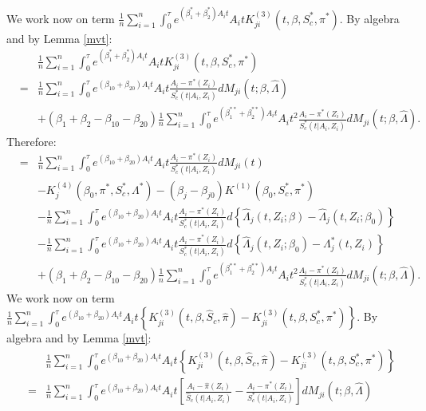 \documentclass[11pt]{article}
\newcommand{\ee}{\end{eqnarray}}
\newcommand{\eqnn}{\begin{eqnarray*}}
\newcommand{\een}{\end{eqnarray*}}
\newcommand{\be}{\begin{eqnarray}}
\begin{document}
\begin{newproof7}
We work now on term $\frac{1}{n}\sum_{i=1}^n\int_0^\tau e^{ (\beta^{*}_1  + \beta^{*}_2)A_i t}A_i t K^{(3)}_{ji}(t, \beta,S^{*}_c,\pi^{*})$. By algebra and by Lemma \ref{mvt}:
\eqnn
&&\frac{1}{n}\sum_{i=1}^n\int_0^\tau e^{ (\beta^{*}_1  + \beta^{*}_2)A_i t}A_i t K^{(3)}_{ji}(t, \beta,S^{*}_c,\pi^{*})\\&=&\frac{1}{n}\sum_{i=1}^n\int_0^\tau e^{ (\beta_{10}  + \beta_{20})A_i t}A_i t \frac{A_i -\pi^{*}( Z_i)}{S^{*}_c(t | A_i,Z_i)}dM_{ji}(t ; \beta, \hat \Lambda)\nonumber\\
&&+(\beta_1+\beta_2-\beta_{10}-\beta_{20})\frac{1}{n}\sum_{i=1}^n\int_0^\tau e^{ (\beta^{**}_1  + \beta^{**}_2)A_i t}A_i t^2 \frac{A_i -\pi^{*}( Z_i)}{S^{*}_c(t | A_i,Z_i)}dM_{ji}(t ; \beta, \hat \Lambda).\nonumber\een
Therefore:
\be\label{31}
&=&\frac{1}{n}\sum_{i=1}^n\int_0^\tau e^{ (\beta_{10}  + \beta_{20})A_i t}A_i t \frac{A_i -\pi^{*}( Z_i)}{S^{*}_c(t | A_i,Z_i)}dM_{ji}(t)\nonumber\\
&&-K^{(4)}_j(\beta_0, \pi^{*}, S^{*}_c, \Lambda^{*})-(\beta_j-\beta_{j0})K^{(1)}(\beta_0,S^{*}_c,\pi^{*})\nonumber\\&&-\frac{1}{n}\sum_{i=1}^n\int_0^\tau e^{ (\beta_{10}  + \beta_{20})A_i t}A_i t \frac{A_i -\pi^{*}( Z_i)}{S^{*}_c(t | A_i,Z_i)}d\left\{\hat \Lambda_j(t,Z_i ; \beta)- \hat \Lambda_j(t,Z_i ; \beta_0)\right\}\nonumber\\
&&-\frac{1}{n}\sum_{i=1}^n\int_0^\tau e^{ (\beta_{10}  + \beta_{20})A_i t}A_i t \frac{A_i -\pi^{*}( Z_i)}{S^{*}_c(t | A_i,Z_i)}d\left\{\hat \Lambda_j(t,Z_i ; \beta_0)- \Lambda^{*}_j(t,Z_i)\right\}\nonumber\\
&&+(\beta_1+\beta_2-\beta_{10}-\beta_{20})\frac{1}{n}\sum_{i=1}^n\int_0^\tau e^{ (\beta^{**}_1  + \beta^{**}_2)A_i t}A_i t^2 \frac{A_i -\pi^{*}( Z_i)}{S^{*}_c(t | A_i,Z_i)}dM_{ji}(t ; \beta, \hat \Lambda).\nonumber
\ee
We work now on term $\frac{1}{n}\sum_{i=1}^n\int_0^\tau e^{ (\beta_{10}  + \beta_{20})A_i t}A_i t \left\{K^{(3)}_{ji}(t, \beta, \hat S_c,\hat \pi)-K^{(3)}_{ji}(t, \beta,S^{*}_c,\pi^{*})\right\}$. By algebra and by Lemma \ref{mvt}:
\eqnn
&&\frac{1}{n}\sum_{i=1}^n\int_0^\tau e^{ (\beta_{10}  + \beta_{20})A_i t}A_i t \left\{K^{(3)}_{ji}(t, \beta,\hat S_c, \hat \pi)-K^{(3)}_{ji}(t, \beta, S^{*}_c, \pi^{*})\right\}
\\&=&\frac{1}{n}\sum_{i=1}^n\int_0^\tau e^{ (\beta_{10}  + \beta_{20})A_i t}A_i t \left[\frac{A_i -\hat \pi( Z_i)}{\hat S_c(t | A_i,Z_i)}-\frac{A_i -\pi^{*}( Z_i)}{S^{*}_c(t | A_i,Z_i)}\right]dM_{ji}(t ; \beta, \hat \Lambda)\nonumber\\
\een

\end{newproof7}
\end{document}
